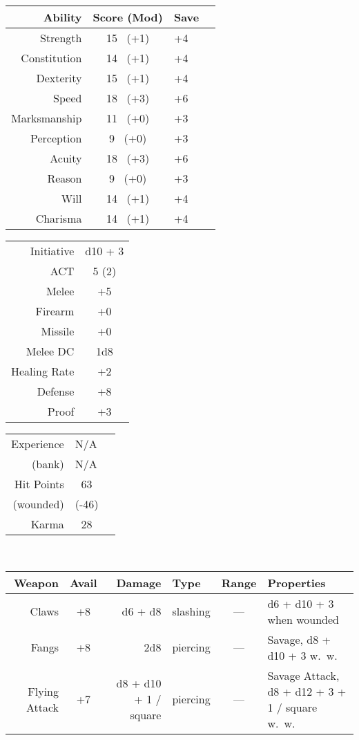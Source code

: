 \documentclass[11pt]{article}
\newcommand{\heading}[1]{{\sc\bfseries #1}}
\begin{document}
\noindent
\begin{tabular}[t]{|r|c|l|c|}
\hline
\heading{Ability}
& \heading{Score (Mod)}
& \heading{Save}
\\ \hline \hline
\sc Strength & 15 \ (+1)
& +4
\\
\sc Constitution & 14 \ (+1)
& +4
\\ \hline
\sc Dexterity & 15 \ (+1)
& +4
\\
\sc Speed & 18 \ (+3)
& +6
\\ \hline
\sc Marksmanship & 11 \ (+0)
& +3
\\
\sc Perception & 9 \ (+0)
& +3
\\
\sc Acuity & 18 \ (+3)
& +6
\\ \hline
\sc Reason & 9 \ (+0)
& +3
\\
\sc Will & 14 \ (+1)
& +4
\\
\sc Charisma & 14 \ (+1)
& +4
\\ \hline
\end{tabular}
\hfill
\begin{tabular}[t]{|r|c|}
\hline
\sc Initiative & d10 + 3
\\
\sc ACT & 5 (2)
\\  \hline
\sc Melee & +5
\\
\sc Firearm & +0
\\
\sc Missile & +0
\\ \hline
\sc Melee DC & 1d8
\\ \hline
\sc Healing Rate & +2
\\ \hline
\sc Defense & +8
\\
\sc Proof & +3
\\ \hline
\end{tabular}
%
\hfill
%
\begin{tabular}[t]{|r|c|c|}
\hline
\sc Experience & \multicolumn{2}{|l|}{N/A}
\\
(bank) & \multicolumn{2}{|l|}{N/A}
\\ \hline
\sc Hit Points & 63 & \hspace*{8em}
\\
(wounded) & (-46) &
\\[2pt] \hline
\sc Karma & 28 &
\\ \hline
\end{tabular}
%
\\[8pt]
%
\noindent
\begin{tabular}[t]{|r|crl|c|l|}
\hline
\sc\bfseries Weapon
& \sc\bfseries Avail
& \sc\bfseries Damage
& \sc\bfseries Type
& \sc\bfseries Range
& \sc\bfseries Properties
\\ \hline\hline
Claws & +8 & d6 + d8 & slashing & ---
& d6 + d10 + 3 when wounded
\\
Fangs & +8 & 2d8 & piercing & ---
& Savage, d8 + d10 + 3 w.~w.
\\
Flying Attack & +7 & d8 + d10 + 1 / square & piercing & ---
& Savage Attack, d8 + d12 + 3 + 1 / square w.~w.
\\ \hline
\end{tabular}
\end{document}
